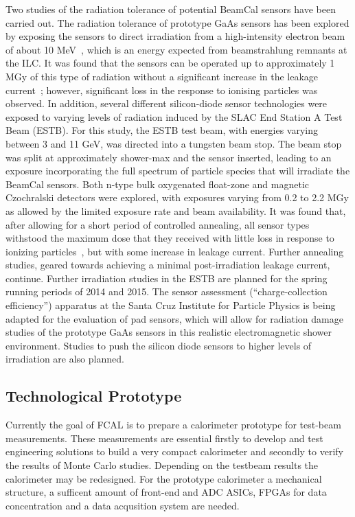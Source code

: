 Two studies of the radiation tolerance of potential BeamCal sensors have been carried out. The
radiation tolerance of prototype GaAs sensors has been explored by exposing the sensors
to direct irradiation from a high-intensity electron beam of about 10 MeV~\cite{sdalinac},
which is an energy expected from beamstrahlung
remnants at the ILC.
It was found that the sensors can be operated up
to approximately 1 MGy of this type of radiation without a significant increase in the
leakage current~\cite{1748-0221-7-11-P11022}; however, significant loss in the response to ionising particles was observed.
In addition, several different silicon-diode sensor technologies were exposed to varying levels
of radiation induced by the SLAC End Station A Test Beam (ESTB).
For this study, the ESTB test beam, with energies
varying between 3 and 11 GeV, was directed into a tungsten beam stop.
The beam stop was split at approximately shower-max and the sensor inserted,
leading to an exposure incorporating the full spectrum of particle species that will
irradiate the BeamCal sensors. Both n-type bulk oxygenated float-zone and magnetic Czochralski
detectors were explored, with exposures varying from 0.2 to 2.2 MGy as allowed by
the limited exposure rate and
beam availability. It was found that, after allowing for a short period of controlled annealing,
all sensor types withstood the maximum dose that they received with little loss in response
to ionizing particles~\cite{2014arXiv1402.2692B}, but with some increase in leakage current. Further annealing studies,
geared towards achieving a minimal post-irradiation leakage current, continue.
Further irradiation studies in the ESTB are planned for the spring running periods of 2014 and 2015.
The sensor assessment (``charge-collection efficiency'') apparatus at the Santa Cruz Institute
for Particle Physics is being adapted for the evaluation of pad sensors, which will allow for radiation
damage studies of the prototype GaAs sensors in this realistic electromagnetic shower environment.
Studies to push the silicon diode sensors to higher levels of irradiation are also planned.


\subsection{Technological Prototype}

Currently the goal of FCAL is to prepare a calorimeter prototype for test-beam measurements. These measurements
are essential firstly to develop and test engineering solutions to build a very compact calorimeter and
secondly to verify the results of Monte Carlo studies. Depending on the testbeam
results the calorimeter may be redesigned.
For the prototype calorimeter
a mechanical structure, a sufficent amount of front-end and ADC ASICs, FPGAs for
data concentration and
a data acqusition system are needed.

